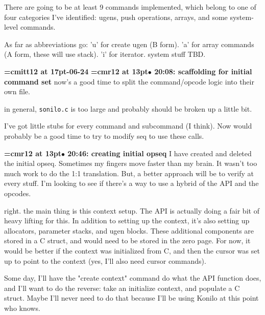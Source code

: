 There are going to be at least 9 commands implemented, which belong to one of four categories I've identified: ugens, push operations, arrays, and some system-level commands.
\par

As far as abbreviations go: 'u' for create ugen (B form). 'a' for array commands (A form, these will use stack). 'i' for iterator. system stuff TBD.
\par

{\medskip\noindent\bf\font\titlefont=cmitt12 at 17pt-06-24}\medskip
{\smallskip\noindent\bf\font\titlefont=cmr12 at 13pt\titlefont $\bullet$ 20:08: scaffolding for initial command set}\smallskip
now's a good time to split the command/opcode logic into their own file.
\par

in general, {\tt sonilo.c} is too large and probably should be broken up a little bit.
\par

I've got little stubs for every command and subcommand (I think). Now would probably be a good time to try to modify seq to use these calls.
\par

{\smallskip\noindent\bf\font\titlefont=cmr12 at 13pt\titlefont $\bullet$ 20:46: creating initial opseq}\smallskip
I have created and deleted the initial opseq. Sometimes my fingers move faster than my brain. It wasn't too much work to do the 1:1 translation. But, a better approach will be to verify at every stuff. I'm looking to see if there's a way to use a hybrid of the API and the opcodes.
\par

right. the main thing is this context setup. The API is actually doing a fair bit of heavy lifting for this. In addition to setting up the context, it's also setting up allocators, parameter stacks, and ugen blocks. These additional components are stored in a C struct, and would need to be stored in the zero page. For now, it would be better if the context was initialized from C, and then the cursor was set up to point to the context (yes, I'll also need cursor commands).
\par

Some day, I'll have the "create context" command do what the API function does, and I'll want to do the reverse: take an initialize context, and populate a C struct. Maybe I'll never need to do that because I'll be using Konilo at this point who knows.
\par

